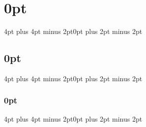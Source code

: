 \titlespacing\section{0pt}{4pt plus 4pt minus 2pt}{0pt plus 2pt minus 2pt} 
\titlespacing\subsection{0pt}{4pt plus 4pt minus 2pt}{0pt plus 2pt minus 2pt} 
\titlespacing\subsubsection{0pt}{4pt plus 4pt minus 2pt}{0pt plus 2pt minus 2pt}
\makeatletter
\let\oldl@chapter\l@chapter
\def\l@chapter#1#2{\oldl@chapter{#1}{\textsf{#2}}}
\let\old@dottedcontentsline\@dottedtocline
\def\@dottedtocline#1#2#3#4#5{%
\old@dottedcontentsline{#1}{#2}{#3}{#4}{{\textsf{#5}}}}
\makeatother
